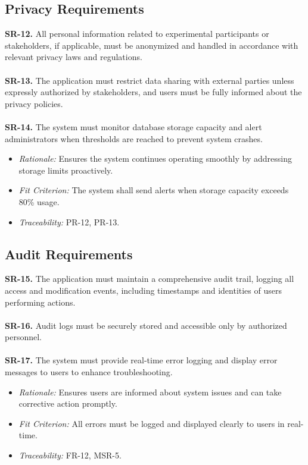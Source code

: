 \documentclass{article}
\begin{document}
\subsection{Privacy Requirements}
\textbf{SR-12.} All personal information related to experimental participants or
  stakeholders, if applicable, must be anonymized and handled in accordance with
  relevant privacy laws and regulations. \ \\
\ \\
\textbf{SR-13.} The application must restrict data sharing with external parties
  unless expressly authorized by stakeholders, and users must be fully informed
  about the privacy policies. \ \\
  \ \\
  \textbf{SR-14.} The system must monitor database storage capacity and alert
  administrators when thresholds are reached to prevent system crashes.
    \begin{itemize}
      \item \textit{Rationale:} Ensures the system continues operating smoothly
      by addressing storage limits proactively.
      \item \textit{Fit Criterion:} The system shall send alerts when storage
      capacity exceeds 80\% usage.
      \item \textit{Traceability:} PR-12, PR-13.
    \end{itemize}

\subsection{Audit Requirements}
\textbf{SR-15.} The application must maintain a comprehensive audit trail,
  logging all access and modification events, including timestamps and
  identities of users performing actions. \ \\
\ \\
\textbf{SR-16.} Audit logs must be securely stored and accessible only by
  authorized personnel. \ \\
  \ \\
  \textbf{SR-17.} The system must provide real-time error logging and display
  error messages to users to enhance troubleshooting.
    \begin{itemize}
      \item \textit{Rationale:} Ensures users are informed about system issues
      and can take corrective action promptly.
      \item \textit{Fit Criterion:} All errors must be logged and displayed
      clearly to users in real-time.
      \item \textit{Traceability:} FR-12, MSR-5.
    \end{itemize}
  
\end{document}
